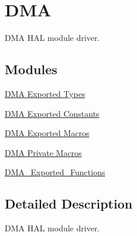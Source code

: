 \hypertarget{group___d_m_a}{}\section{D\+MA}
\label{group___d_m_a}


D\+MA H\+AL module driver.  


\subsection*{Modules}
\begin{DoxyCompactItemize}
\item 
\hyperlink{group___d_m_a___exported___types}{D\+M\+A Exported Types}
\item 
\hyperlink{group___d_m_a___exported___constants}{D\+M\+A Exported Constants}
\item 
\hyperlink{group___d_m_a___exported___macros}{D\+M\+A Exported Macros}
\item 
\hyperlink{group___d_m_a___private___macros}{D\+M\+A Private Macros}
\item 
\hyperlink{group___d_m_a___exported___functions}{D\+M\+A\+\_\+\+Exported\+\_\+\+Functions}
\end{DoxyCompactItemize}


\subsection{Detailed Description}
D\+MA H\+AL module driver. 

